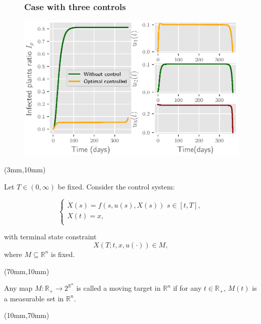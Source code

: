 \documentclass[10pt]{beamer}
\begin{document}
\begin{frame}
\begin{figure}
\frametitle{Case with three controls}
	\centering	
	\includegraphics[scale=0.5]{Feathergraphics/three_controls_simulation_1.eps}
\end{figure}	
\end{frame}
%
%
\begin{frame}

\begin{textblock*}{65mm}(3mm,10mm)
	\begin{greenbox}{}
		Let $T\in (0,\infty)$ be fixed. Consider the control system:

		$$\left\{ \begin{array}{l}
		\dot{X}(s)=f(s,u(s),X(s))\,\,s\in [t,T], \\
		X(t)=x,\\
		\end{array}
		\right.$$

		with terminal state constraint
		$$X(T;t,x,u(\cdot))\in M,$$
		where $M\subseteq \mathbb{R}^n$ is fixed.
	\end{greenbox}
\end{textblock*}

\begin{textblock*}{55mm}(70mm,10mm)
	\begin{yellowbox}{}
		Any map $M:\mathbb{R}_{+}\rightarrow 2^{\mathbb{R}^n}$ is called a moving target in $\mathbb{R}^n$ if for any $t\in \mathbb{R}_{+}$, $M(t)$ is a measurable set in $			\mathbb{R}^n$.
	\end{yellowbox}
\end{textblock*}
\begin{textblock*}{100mm}(10mm,70mm)
	\begin{yellowbox}{}
		
	\end{yellowbox}
\end{textblock*}
\end{frame}
\end{document}
